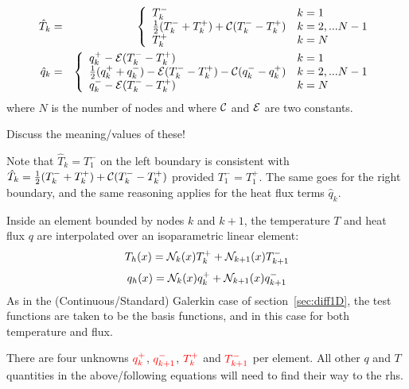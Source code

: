 \begin{eqnarray}
\hat{T}_k &=&
\left\{
\begin{array}{ll}
T_k^-   & k=1 \\ 
\frac{1}{2}(T_k^-+T_k^+) + {\cal C} (T_k^- - T_k^+) & k=2,...N-1\\
T_k^+    & k=N \\ 
\end{array}
\right. \nonumber\\
\hat{q}_k &=&
\left\{
\begin{array}{ll}
q_k^+ -{\cal E} (T_k^--T_k^+)  & k=1 \\ 
\frac{1}{2}(q_k^+ + q_k^-) - {\cal E} (T_k^- - T_k^+) - {\cal C}(q_k^- - q_k^+) & k=2,...N-1\\
q_k^- -{\cal E} (T_k^--T_k^+)    & k=N \\ 
\end{array}
\right.
\end{eqnarray}
where $N$ is the number of nodes and where ${\cal C}$ and ${\cal E}$ are two constants. 

{\color{green} Discuss the meaning/values of these!}

\begin{remark}
Note that $\hat{T}_k=T_1^-$ on the left boundary is consistent with 
$\hat{T}_k=\frac{1}{2}(T_k^-+T_k^+) + {\cal C} (T_k^- - T_k^+)$ provided $T_1^-=T_1^+$.
The same goes for the right boundary, and the same reasoning applies for the heat flux terms $\hat{q}_k$. 
\end{remark}

Inside an element bounded by nodes $k$ and $k+1$, 
the temperature $T$ and heat flux $q$ are interpolated over an isoparametric linear element:
\[
T_h(x) = {\mathcal{N}}_k(x) T_k^+ + {\mathcal{N}}_{k+1}(x)T_{k+1}^-
\]
\[
q_h(x) = {\mathcal{N}}_k(x) q_k^+ + {\mathcal{N}}_{k+1}(x)q_{k+1}^-
\]
As in the (Continuous/Standard) Galerkin case of section~\ref{sec:diff1D}, the test functions are taken to 
be the basis functions, and in this case for both temperature and flux. 

There are four unknowns ${\color{red} q_k^+}$, ${\color{red} q_{k+1}^-}$, 
${\color{red}T_k^+}$ and ${\color{red}T_{k+1}^-}$ per element. 
All other $q$ and $T$ quantities in the above/following equations will need to find their way to the rhs. 

